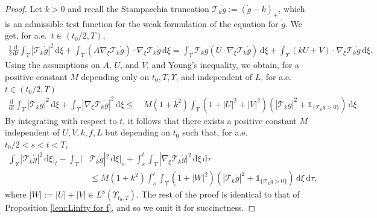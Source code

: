 \documentclass[11pt,a4paper,reqno]{amsart}
\theoremstyle{remark}
\theoremstyle{definition}
\numberwithin{equation}{section}
\newcommand{\bxi}{\xi}
\renewcommand{\d}{\, \mathrm{d} }
\newcommand{\der}{\mathrm{d}}
\begin{document}
\begin{proof}
   Let $k > 0$ and recall the Stampacchia truncation $\mathscr{T}_k \dot{g} := (\dot{g}-k)_+$, which is an admissible test function for the weak formulation of the equation for $\dot{g}$. We get, for a.e.~$t \in (t_0/2,T)$, 
    \begin{equation*}
        \begin{aligned}
            \frac{1}{2}\frac{\der}{\der t}\int_{\Upsilon} \!|\mathscr{T}_k \dot{g}|^2 \d \bxi \!+\!\int_{\Upsilon}\! (A\nabla_{\bxi}\mathscr{T}_k \dot{g}) \cdot \nabla_{\bxi} \mathscr{T}_k \dot{g} \d \bxi\! =\!\!\! \int_{\Upsilon}\! \!\mathscr{T}_k g (U \!\cdot \!\nabla_{\bxi} \mathscr{T}_k \dot{g}) \d \bxi \!+\! \int_{\Upsilon}\! (kU+V) \!\cdot \!\nabla_{\bxi} \mathscr{T}_k \dot{g} \d \bxi. 
        \end{aligned}
    \end{equation*}
Using the assumptions on $A$, $U$, and $V$, and Young's inequality, we obtain, for a positive constant $M$ depending only on $t_0,T,\Upsilon$, and independent of $L$, for a.e.~$t \in (t_0/2,T)$ 
\begin{equation*}
            \begin{aligned}
            \frac{\der}{\der t}\int_{\Upsilon} |\mathscr{T}_k \dot{g}|^2 \d \bxi +\int_{\Upsilon} |\nabla_{\bxi} \mathscr{T}_k \dot{g} |^2 \d \bxi\leq & \, M(1+k^2) \int_{\Upsilon}  (1 \!+\! |U|^2 \!+\! |V|^2) (|\mathscr{T}_k \dot{g}|^2 \!+\! \mathds{1}_{\{\mathscr{T}_k \dot{g}>0\}}) \d \bxi. 
        \end{aligned}
\end{equation*}
By integrating with respect to $t$, it follows that there exists a positive constant $M$ independent of $U,V,k,f,L$ but depending on $t_0$ such that, for a.e.~$t_0/2<s<t<T$, 
\begin{equation}\label{eq:caccioppoli dot}
            \begin{aligned}
            \int_{\Upsilon} |\mathscr{T}_k \dot{g}|^2 \d \bxi\bigg|_{t} - \int_{\Upsilon} |& \mathscr{T}_k \dot{g}|^2 \d \bxi\bigg|_{s} + \int_s^t \int_{\Upsilon} |\nabla_{\bxi} \mathscr{T}_k \dot{g} |^2 \d \bxi \d \tau \\ 
            &\leq M(1+k^2) \int_s^t \int_{\Upsilon} (1 + |W|^2) (|\mathscr{T}_k \dot{g}|^2 + \mathds{1}_{\{\mathscr{T}_k \dot{g} >0\}}) \d \bxi \d \tau, 
        \end{aligned}
\end{equation}
where $|W| := |U| + |V| \in L^8(\Upsilon_{t_0,T})$. The rest of the proof is identical to that of Proposition \ref{lem:Linfty for f}, and so we omit it for succinctness. 
\end{proof}
\end{document}
